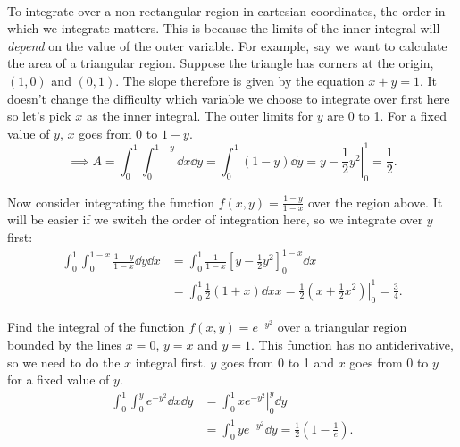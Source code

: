 \documentclass[../multivariate_calculus.tex]{subfiles}
\begin{document}
        \paragraph{}
        To integrate over a non-rectangular region in cartesian coordinates, the order in which we integrate matters.
        This is because the limits of the inner integral will \textit{depend} on the value of the outer variable.
        For example, say we want to calculate the area of a triangular region.
        Suppose the triangle has corners at the origin, $(1,0)$ and $(0,1)$.
        The slope therefore is given by the equation $x+y=1$.
        It doesn't change the difficulty which variable we choose to integrate over first here so let's pick $x$ as the inner integral.
        The outer limits for $y$ are 0 to 1.
        For a fixed value of $y$, $x$ goes from 0 to $1-y$.
        \begin{equation}
            \implies A=\int_0^1\int_0^{1-y}\dd{x}\dd{y}=\int_0^1(1-y)\dd{y}=y-\left.\frac{1}{2}y^2\right|_0^1=\frac{1}{2}.
        \end{equation}
        \begin{example}
            Now consider integrating the function $f(x,y)=\frac{1-y}{1-x}$ over the region above.
            It will be easier if we switch the order of integration here, so we integrate over $y$ first:
            \begin{align}
                \int_0^1\int_0^{1-x}\frac{1-y}{1-x}\dd{y}\dd{x}&=\int_0^1\frac{1}{1-x}\left[y-\frac{1}{2}y^2\right]_0^{1-x}\dd{x}\\
                &=\int_0^1\frac{1}{2}(1+x)\dd{x}x=\left.\frac{1}{2}\left(x+\frac{1}{2}x^2\right)\right|_0^1=\frac{3}{4}.
            \end{align}
        \end{example}
        \begin{example}
            Find the integral of the function $f(x,y)=e^{-y^2}$ over a triangular region bounded by the lines $x=0$, $y=x$ and $y=1$.
            This function has no antiderivative, so we need to do the $x$ integral first.
            $y$ goes from 0 to 1 and $x$ goes from 0 to $y$ for a fixed value of $y$.
            \begin{align}
                \int_0^1\int_0^y e^{-y^2}\dd{x}\dd{y}&=\int_0^1\left.xe^{-y^2}\right|_0^y\dd{y}\\
                &=\int_0^1 ye^{-y^2}\dd{y}=\frac{1}{2}\left(1-\frac{1}{e}\right).
            \end{align}
        \end{example}
\end{document}
